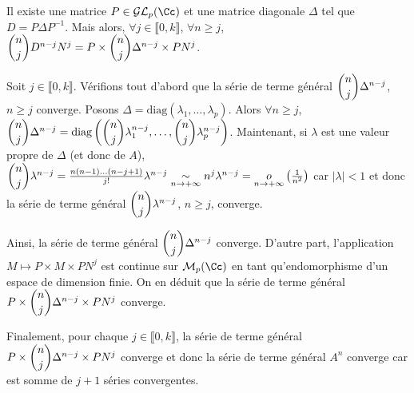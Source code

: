 {{Il existe une matrice $P\in\mathcal{GL}_p(\Cc)$ et une matrice diagonale $\Delta$ tel que $D=P\Delta P^{-1}$. Mais alors, $\forall j\in\llbracket0,k\rrbracket$, $\forall n\geqslant j$, $\dbinom{n}{j}D^{n-j}N^j=P\times\dbinom{n}{j}\Delta^{n-j}\times PN^j$.

Soit $j\in\llbracket0,k\rrbracket$. Vérifions tout d'abord que la série de terme général $\dbinom{n}{j}\Delta^{n-j}$, $n\geqslant j$ converge. Posons $\Delta=\text{diag}(\lambda_1,\ldots,\lambda_p)$. Alors $\forall n\geqslant j$, $\dbinom{n}{j}\Delta^{n-j}=\text{diag}\left(\dbinom{n}{j}\lambda_1^{n-j},\ldots,\dbinom{n}{j}\lambda_p^{n-j}\right)$. Maintenant, si $\lambda$ est une valeur propre de $\Delta$ (et donc de $A$), $\dbinom{n}{j}\lambda^{n-j}= \frac{n(n-1)\ldots(n-j+1)}{j!}\lambda^{n-j}\underset{n\rightarrow+\infty}{\sim}n^j\lambda^{n-j}=\underset{n\rightarrow+\infty}o\left( \frac{1}{n^2}\right)$ car $|\lambda|<1$ et donc la série de terme général $\dbinom{n}{j}\lambda^{n-j}$, $n\geqslant j$, converge.

Ainsi, la série de terme général $\dbinom{n}{j}\Delta^{n-j}$ converge. D'autre part, l'application $M\mapsto P\times M\times PN^j$ est continue sur $\mathcal{M}_p(\Cc)$ en tant qu'endomorphisme d'un espace de dimension finie. On en déduit que la série de terme général $P\times\dbinom{n}{j}\Delta^{n-j}\times PN^j$ converge.

Finalement, pour chaque $j\in\llbracket0,k\rrbracket$, la série de terme général $P\times\dbinom{n}{j}\Delta^{n-j}\times PN^j$ converge et donc la série de terme général $A^n$ converge car est somme de $j+1$ séries convergentes.
}
}
